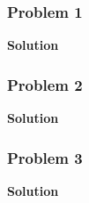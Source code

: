 \subsubsection*{Problem 1}

\textbf{Solution}

\subsubsection*{Problem 2}

\textbf{Solution}

\subsubsection*{Problem 3}

\textbf{Solution}